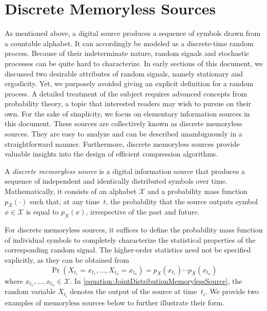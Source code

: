 \section{Discrete Memoryless Sources}

As mentioned above, a digital source produces a sequence of symbols drawn from a countable alphabet.
It can accordingly be modeled as a discrete-time random process.
Because of their indeterminate nature, random signals and stochastic processes can be quite hard to characterize.
In early sections of this document, we discussed two desirable attributes of random signals, namely stationary and ergodicity.
Yet, we purposely avoided giving an explicit definition for a random process.
A detailed treatment of the subject requires advanced concepts from probability theory, a topic that interested readers may wish to pursue on their own.
For the sake of simplicity, we focus on elementary information sources in this document.
These sources are collectively known as discrete memoryless sources.
They are easy to analyze and can be described unambiguously in a straightforward manner.
Furthermore, discrete memoryless sources provide valuable insights into the design of efficient compression algorithms.

\begin{definition}
A \emph{discrete memoryless source} is a digital information source that produces a sequence of independent and identically distributed symbols over time.
Mathematically, it consists of an alphabet $\mathcal{X}$ and a probability mass function $p_X(\cdot)$ such that, at any time~$t$, the probability that the source outputs symbol $x \in \mathcal{X}$ is equal to $p_X(x)$, irrespective of the past and future.
\end{definition}

For discrete memoryless sources, it suffices to define the probability mass function of individual symbols to completely characterize the statistical properties of the corresponding random signal.
The higher-order statistics need not be specified explicitly, as they can be obtained from
\begin{equation} \label{equation:JointDistributionMemorylessSource}
\Pr (X_{t_1} = x_{t_1}, \ldots, X_{t_n} = x_{t_n})
= p_X(x_{t_1})  \cdots p_X(x_{t_n})
\end{equation}
where $x_{t_1}, \ldots, x_{t_n} \in \mathcal{X}$.
In \eqref{equation:JointDistributionMemorylessSource}, the random variable $X_{t_i}$ denotes the output of the source at time~$t_i$.
We provide two examples of memoryless sources below to further illustrate their form.

